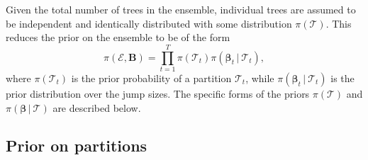 \documentclass[12pt]{article}
\newcommand{\bm}[1]{\boldsymbol{#1}}
\newcommand{\mE}{\mathcal{E}}
\newcommand{\mT}{\mathcal{T}}
\newcommand{\1}{\mathbb{I}}
\def\C {\,|\:}
\def\C {\,|\:}
\def\B{\bm{B}}
\def\b{\bm{\beta}}
\def\b{\bm{\beta}}
\def\C{\mbox{\boldmath$C$}}
\def\b{\mbox{\boldmath$b$}}
\def\B{\mbox{\boldmath$B$}}
\def\C {\,|\:}
\def\C {\,|\:}
\def\B{\bm{B}}
\def\b{\bm{\beta}}
\def\b{\bm{\beta}}
\theoremstyle{plain}
\theoremstyle{definition}
\theoremstyle{remark}
\begin{document}
Given the total number of trees in the ensemble, individual trees are assumed to be independent and identically distributed with some distribution $\pi(\mT)$. This reduces the prior on the ensemble to be of the form
\begin{equation}\label{eq:joint_prior}
\pi(\mE,\B)=\prod_{t=1}^T\pi(\mT_t)\pi(\b_t\C\mT_t),
\end{equation}
where $\pi(\mT_t)$ is the prior probability of a partition $\mT_t$, while $\pi(\b_t\C\mT_t)$ is the prior distribution over the jump sizes.
The specific forms of the priors $\pi(\mT)$ and $\pi(\b \C \mT)$ are described below.

\subsection{\bf Prior on partitions}\label{sub:prior_tree} 
\end{document}
